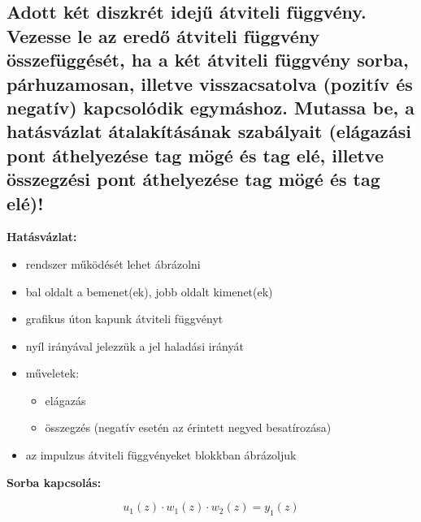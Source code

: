 \subsection{Adott két diszkrét idejű átviteli függvény. Vezesse le az eredő átviteli függvény összefüggését, ha a két átviteli függvény sorba, párhuzamosan, illetve visszacsatolva (pozitív és negatív) kapcsolódik egymáshoz. Mutassa be, a hatásvázlat átalakításának szabályait (elágazási pont áthelyezése tag mögé és tag elé, illetve összegzési pont áthelyezése tag mögé és tag elé)!}

\noindent \textbf{Hatásvázlat:}
\begin{itemize}
    \item rendszer működését lehet ábrázolni
    \item bal oldalt a bemenet(ek), jobb oldalt kimenet(ek)
    \item grafikus úton kapunk átviteli függvényt
    \item nyíl irányával jelezzük a jel haladási irányát
    \item műveletek:
    \begin{itemize}
        \item elágazás
        \item összegzés (negatív esetén az érintett negyed besatírozása)
    \end{itemize}
    \item az impulzus átviteli függvényeket blokkban ábrázoljuk
\end{itemize}

\noindent \textbf{Sorba kapcsolás:}
\begin{figure}[H]
    \centering
\end{figure}
$$ u_1(z) \cdot w_1(z) \cdot w_2(z) = y_1(z) $$

